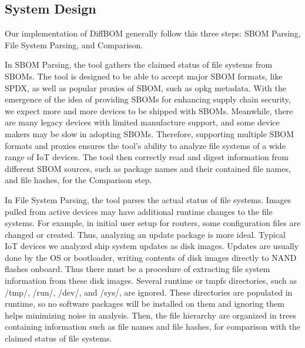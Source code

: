 \subsection{System Design}
Our implementation of DiffBOM generally follow this three steps: SBOM Parsing, File System Parsing, and Comparison.\par %
In SBOM Parsing, the tool gathers the claimed status of file systems from SBOMs. The tool is designed to be able to accept major SBOM formats, like SPDX, as well as popular proxies of SBOM, such as opkg metadata. With the emergence of the idea of providing SBOMs for enhancing supply chain security, we expect more and more devices to be shipped with SBOMs. Meanwhile, there are many legacy devices with limited manufacture support, and some device makers may be slow in adopting SBOMs. Therefore, supporting multiple SBOM formats and proxies ensures the tool's ability to analyze file systems of a wide range of IoT devices. The tool then correctly read and digest information from different SBOM sources, such as package names and their contained file names, and file hashes, for the Comparison step.\par
In File System Parsing, the tool parses the actual status of file systems. Images pulled from active devices may have additional runtime changes to the file systems. For example, in initial user setup for routers, some configuration files are changed or created. Thus, analyzing an update package is more ideal. Typical IoT devices we analyzed ship system updates as disk images. Updates are usually done by the OS or bootloader, writing contents of disk images directly to NAND flashes onboard. Thus there must be a procedure of extracting file system information from these disk images. Several runtime or tmpfs directories, such as /tmp/, /run/, /dev/, and /sys/, are ignored. These directories are populated in runtime, so no software packages will be installed on them and ignoring them helps minimizing noise in analysis. Then, the file hierarchy are organized in trees containing information such as file names and file hashes, for comparison with the claimed status of file systems.\par
